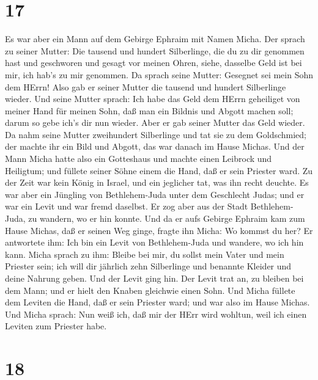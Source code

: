 \hypertarget{section-16}{%
\section{17}\label{section-16}}

 Es war aber ein Mann auf dem Gebirge Ephraim mit Namen
Micha.  Der sprach zu seiner Mutter: Die tausend und hundert
Silberlinge, die du zu dir genommen hast und geschworen und gesagt vor
meinen Ohren, siehe, dasselbe Geld ist bei mir, ich hab's zu mir
genommen. Da sprach seine Mutter: Gesegnet sei mein Sohn dem HErrn!
 Also gab er seiner Mutter die tausend und hundert
Silberlinge wieder. Und seine Mutter sprach: Ich habe das Geld dem HErrn
geheiliget von meiner Hand für meinen Sohn, daß man ein Bildnis und
Abgott machen soll; darum so gebe ich's dir nun wieder. 
Aber er gab seiner Mutter das Geld wieder. Da nahm seine Mutter
zweihundert Silberlinge und tat sie zu dem Goldschmied; der machte ihr
ein Bild und Abgott, das war danach im Hause Michas.  Und
der Mann Micha hatte also ein Gotteshaus und machte einen Leibrock und
Heiligtum; und füllete seiner Söhne einem die Hand, daß er sein Priester
ward.  Zu der Zeit war kein König in Israel, und ein
jeglicher tat, was ihn recht deuchte.  Es war aber ein
Jüngling von Bethlehem-Juda unter dem Geschlecht Judas; und er war ein
Levit und war fremd daselbst.  Er zog aber aus der Stadt
Bethlehem-Juda, zu wandern, wo er hin konnte. Und da er aufs Gebirge
Ephraim kam zum Hause Michas, daß er seinen Weg ginge, 
fragte ihn Micha: Wo kommst du her? Er antwortete ihm: Ich bin ein Levit
von Bethlehem-Juda und wandere, wo ich hin kann.  Micha
sprach zu ihm: Bleibe bei mir, du sollst mein Vater und mein Priester
sein; ich will dir jährlich zehn Silberlinge und benannte Kleider und
deine Nahrung geben. Und der Levit ging hin.  Der Levit
trat an, zu bleiben bei dem Mann; und er hielt den Knaben gleichwie
einen Sohn.  Und Micha füllete dem Leviten die Hand, daß er
sein Priester ward; und war also im Hause Michas.  Und
Micha sprach: Nun weiß ich, daß mir der HErr wird wohltun, weil ich
einen Leviten zum Priester habe.

\hypertarget{section-17}{%
\section{18}\label{section-17}}

